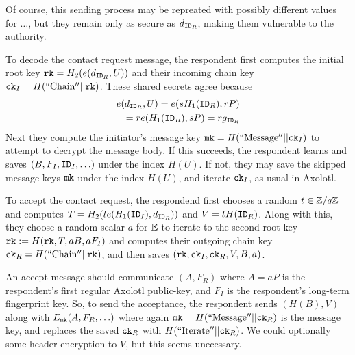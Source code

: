 \documentclass[twoside,letterpaper]{sig-alternate}
\begin{document}
Of course, this sending process may be repreated with possibly different
values for $\ldots$, but they remain only as secure as $d_{\mathtt{ID}_R}$,
making them vulnerable to the authority.

\smallskip

To decode the contact request message, the respondent 
first computes the initial root key $\mathtt{rk} = H_2( e(d_{\mathtt{ID}_R}, U) )$
and their incoming chain key $\mathtt{ck}_I = H(\mathrm{``Chain''} || \mathtt{rk})$.
These shared secrets agree because 
\begin{align*}
e(d_{\mathtt{ID}_R}, U) = e(s H_1(\mathtt{ID}_R), r P) \\ 
 \quad = r e(H_1(\mathtt{ID}_R), s P) = r g_{\mathtt{ID}_R}
\end{align*}
Next they compute the initiator's
 message key $\mathtt{mk} = H(\mathrm{``Message''}  || \mathtt{ck}_I)$ 
to attempt to decrypt the message body.
If this succeeds, the respondent learns and saves $(B,F_I,\mathtt{ID}_I,\ldots)$
 under the index $H(U)$.
If not, they may save the skipped message keys $\mathtt{mk}$ under
the index $H(U)$, and iterate $\mathtt{ck}_I$, as usual in Axolotl.

To accept the contact request,
the respondend first chooses a random $t \in \mathbb{Z}/q\mathbb{Z}$ and 
 computes $T = H_2( t e(H_1(\mathtt{ID}_I),d_{\mathtt{ID}_R}) )$ and $V = t H(\mathtt{ID}_R)$.
Along with this, they choose a random scalar $a$ for $\mathbb{E}$ to
iterate to the second root key $\mathtt{rk} := H(\mathtt{rk}, T, a B, a F_I)$ and
 computes their outgoing chain key $\mathtt{ck}_R = H(\mathrm{``Chain''} || \mathtt{rk})$,
and then saves $(\mathtt{rk},\mathtt{ck}_I,\mathtt{ck}_R,V,B,a)$. 

An accept message should communicate $(A,F_R)$ where 
 $A = a P$ is the respondent's first regular Axolotl public-key, and
 $F_I$ is the respondent's long-term fingerprint key.
So, to send the acceptance, the respondent
sends $(H(B),V)$ along with $E_{\mathtt{mk}}(A,F_R,\ldots)$ where again
 $\mathtt{mk} = H(\mathrm{``Message''}  || \mathtt{ck}_R)$ is the message key,
and replaces the saved $\mathtt{ck}_R$ with $H(\mathrm{``Iterate''} || \mathtt{ck}_R)$.
We could optionally some header encryption to $V$, but this seems unecessary.

\smallskip
\end{document}
